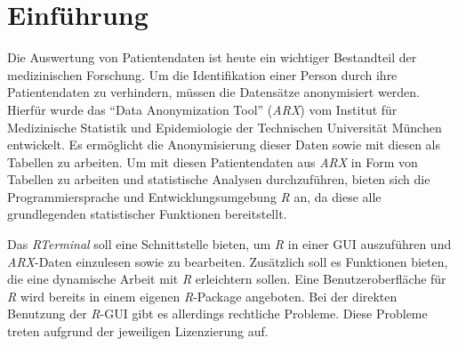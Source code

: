 \documentclass[a4paper, 12pt]{report} %
\begin{document}
\tableofcontents



\chapter{Einführung}\label{einführung}


Die Auswertung von Patientendaten ist heute ein wichtiger Bestandteil der medizinischen Forschung. Um die Identifikation einer Person durch ihre Patientendaten zu verhindern, müssen die Datensätze anonymisiert werden.
Hierfür wurde das "`Data Anonymization Tool"' (\textit{ARX}) vom Institut für Medizinische Statistik und Epidemiologie der Technischen Universität München entwickelt. Es ermöglicht die Anonymisierung dieser Daten sowie mit diesen als Tabellen zu arbeiten.
Um mit diesen Patientendaten aus \textit{ARX} in Form von Tabellen zu arbeiten und statistische Analysen durchzuführen, bieten sich die Programmiersprache und Entwicklungsumgebung \textit{R} an, da diese alle grundlegenden statistischer Funktionen bereitstellt. 

Das \textit{RTerminal} soll eine Schnittstelle bieten, um \textit{R} in einer GUI auszuführen und \textit{ARX}-Daten einzulesen sowie zu bearbeiten. Zusätzlich soll es Funktionen bieten, die eine dynamische Arbeit mit \textit{R} erleichtern sollen. 
Eine Benutzeroberfläche für \textit{R} wird bereits in einem eigenen \textit{R}-Package angeboten. Bei der direkten Benutzung der \textit{R}-GUI gibt es allerdings rechtliche Probleme. Diese Probleme treten aufgrund der jeweiligen Lizenzierung auf.
\end{document}
